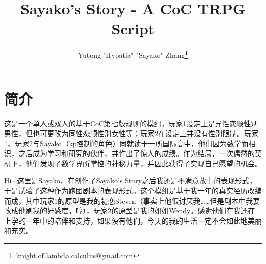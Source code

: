 \documentclass{article}
\title{Sayako's Story - A CoC TRPG Script}
\author{Yutong "Hypatia" "Sayako" Zhang\footnote{knight.of.lambda.calculus@gmail.com}}
\begin{document}
\maketitle

\section{简介} 这是一个单人或双人的基于CoC第七版规则的模组，玩家1设定上是异性恋顺性别男性，但也可更改为同性恋顺性别女性等；玩家2在设定上并没有性别限制。玩家1、玩家2与Sayako（kp控制的角色）同就读于一所国际高中，他们因为数学而相识，之后成为学习和研究的伙伴，并作出了惊人的成绩。作为结局，一次偶然的契机下，他们发现了数学界所掌控的神秘力量，并因此获得了实现自己愿望的机会。

Hi$\sim$这里是Sayako，在创作了Sayako's Story之后我还是不满意故事的表现形式，于是试验了这种作为跑团剧本的表现形式。这个模组是基于我一年的真实经历改编而成，其中玩家1的原型是我的初恋Steven（事实上他很讨厌我……但是剧本中我要改成他刷我的好感度，哼），玩家2的原型是我的姐姐Wendy。感谢他们在我还在上学的一年中的陪伴和支持，如果没有他们，今天的我的生活一定不会如此地美丽和充实。
\end{document}
